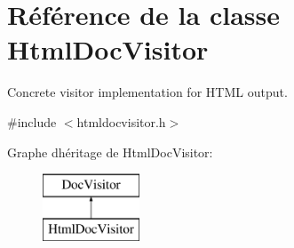\hypertarget{class_html_doc_visitor}{}\section{Référence de la classe Html\+Doc\+Visitor}
\label{class_html_doc_visitor}


Concrete visitor implementation for H\+T\+M\+L output.  




{\ttfamily \#include $<$htmldocvisitor.\+h$>$}

Graphe d\textquotesingle{}héritage de Html\+Doc\+Visitor\+:\begin{figure}[H]
\begin{center}
\leavevmode
\includegraphics[height=2.000000cm]{class_html_doc_visitor}
\end{center}
\end{figure}
